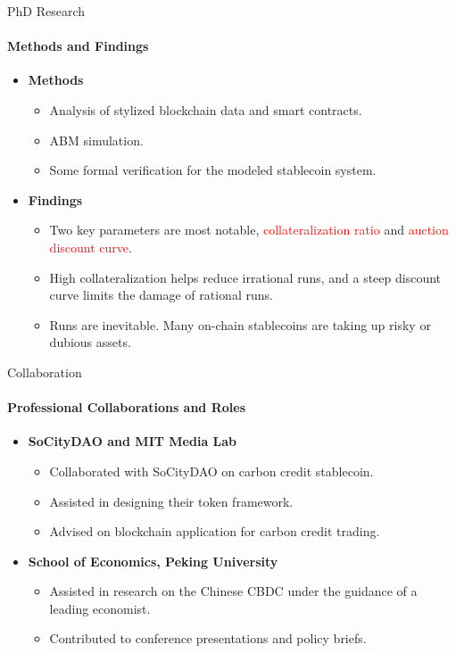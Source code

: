 \documentclass{beamer}
\begin{document}
\begin{frame}{PhD Research}
\framesubtitle{Methods and Findings}

\begin{itemize}
\item \textbf{Methods}
\begin{itemize}
\item Analysis of stylized blockchain data and smart contracts.
\item ABM simulation. 
\item Some formal verification for the modeled stablecoin system.
\end{itemize}

\item \textbf{Findings}
\begin{itemize}
\item Two key parameters are most notable, \textcolor{red}{collateralization ratio} and \textcolor{red}{auction discount curve}.
\item High collateralization helps reduce irrational runs, and a steep discount curve limits the damage of rational runs. 
\item Runs are inevitable. Many on-chain stablecoins are taking up risky or dubious assets.  
\end{itemize}
\end{itemize}
\end{frame}


\begin{frame}{Collaboration}
\framesubtitle{Professional Collaborations and Roles}
\begin{itemize}
\item \textbf{SoCityDAO and MIT Media Lab}
\begin{itemize}
\item Collaborated with SoCityDAO on carbon credit stablecoin.
\item Assisted in designing their token framework.
\item Advised on blockchain application for carbon credit trading.
\end{itemize}
\item \textbf{School of Economics, Peking University}
\begin{itemize}
\item Assisted in research on the Chinese CBDC under the guidance of a leading economist.
\item Contributed to conference presentations and policy briefs.
\end{itemize}
\end{itemize}
\end{frame}
\end{document}
